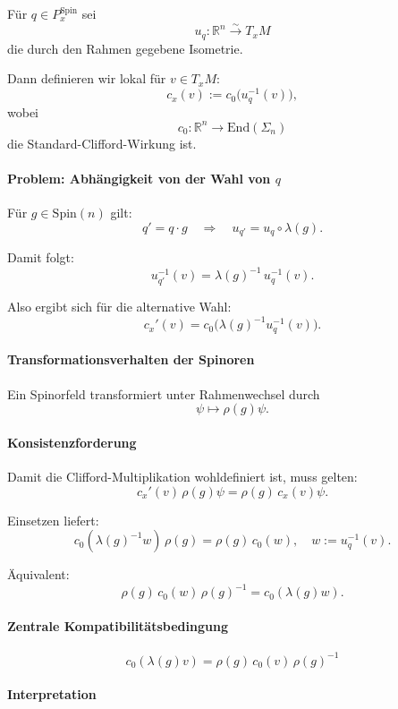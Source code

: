 \documentclass[10pt, letterpaper]{article}
\newcommand{\R}{\mathbb{R}}
\newcommand{\End}{\mathrm{End}}
\newcommand{\Spin}{\mathrm{Spin}}
\begin{document}
Für $q\in P^{\Spin}_x$ sei
\[
u_q:\R^n \xrightarrow{\sim} T_xM
\]
die durch den Rahmen gegebene Isometrie.

Dann definieren wir lokal für $v\in T_xM$:
\[
c_x(v):=c_0\bigl(u_q^{-1}(v)\bigr),
\]
wobei
\[
c_0:\R^n\to \End(\Sigma_n)
\]
die Standard-Clifford-Wirkung ist.

\paragraph{Problem: Abhängigkeit von der Wahl von $q$}

Für $g\in \Spin(n)$ gilt:
\[
q' = q\cdot g
\quad \Longrightarrow \quad
u_{q'} = u_q \circ \lambda(g).
\]

Damit folgt:
\[
u_{q'}^{-1}(v)
=
\lambda(g)^{-1}\,u_q^{-1}(v).
\]

Also ergibt sich für die alternative Wahl:
\[
c_x'(v)
=
c_0\bigl(\lambda(g)^{-1} u_q^{-1}(v)\bigr).
\]

\paragraph{Transformationsverhalten der Spinoren}

Ein Spinorfeld transformiert unter Rahmenwechsel durch
\[
\psi \longmapsto \rho(g)\psi.
\]

\paragraph{Konsistenzforderung}

Damit die Clifford-Multiplikation wohldefiniert ist, muss gelten:
\[
c_x'(v)\,\rho(g)\psi
=
\rho(g)\,c_x(v)\psi.
\]

Einsetzen liefert:
\[
c_0(\lambda(g)^{-1} w)\,\rho(g)
=
\rho(g)\,c_0(w),
\quad w:=u_q^{-1}(v).
\]

Äquivalent:
\[
\rho(g)\,c_0(w)\,\rho(g)^{-1}
=
c_0(\lambda(g) w).
\]

\paragraph{Zentrale Kompatibilitätsbedingung}

\begin{equation}
\boxed{
c_0(\lambda(g) v)
=
\rho(g)\,c_0(v)\,\rho(g)^{-1}
}
\end{equation}

\paragraph{Interpretation}
\end{document}
